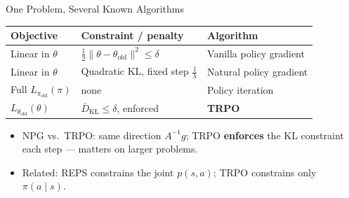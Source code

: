 \documentclass[aspectratio=169]{beamer}
\newcommand{\told}{\theta_{\mathrm{old}}}
\newcommand{\piold}{\pi_{\mathrm{old}}}
\begin{document}
\begin{frame}{One Problem, Several Known Algorithms}
  \begin{center}
  \renewcommand{\arraystretch}{1.3}
  \begin{tabular}{l l l}
    \toprule
    \textbf{Objective} & \textbf{Constraint / penalty} & \textbf{Algorithm} \\
    \midrule
    Linear in $\theta$ & $\tfrac12\|\theta-\told\|^2 \le \delta$ & Vanilla policy gradient \\
    Linear in $\theta$ & Quadratic KL, fixed step $\tfrac{1}{\lambda}$ & Natural policy gradient \\
    Full $L_{\piold}(\pi)$ & none & Policy iteration \\
    $L_{\told}(\theta)$ & $\bar D_{\mathrm{KL}} \le \delta$, enforced & \textbf{TRPO} \\
    \bottomrule
  \end{tabular}
  \end{center}
  \vspace{6pt}
  \begin{itemize}
    \item NPG vs.\ TRPO: same direction $A^{-1}g$; TRPO \textbf{enforces} the KL constraint each step --- matters on larger problems.
    \item Related: REPS constrains the joint $p(s,a)$; TRPO constrains only $\pi(a\mid s)$.
  \end{itemize}
\end{frame}
\end{document}
